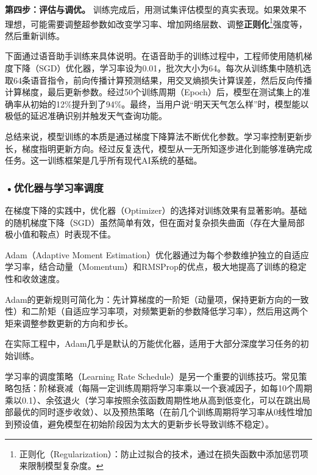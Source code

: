 
\textbf{第四步：评估与调优。} 训练完成后，用测试集评估模型的真实表现。如果效果不理想，可能需要调整超参数如改变学习率、增加网络层数、调整\textbf{正则化}\footnote{正则化（Regularization）：防止过拟合的技术，通过在损失函数中添加惩罚项来限制模型复杂度。}强度等，然后重新训练。

下面通过语音助手训练来具体说明。在语音助手的训练过程中，工程师使用随机梯度下降（SGD）优化器，学习率设为0.01，批次大小为64。每次从训练集中随机选取64条语音指令，前向传播计算预测结果，用交叉熵损失计算误差，然后反向传播计算梯度，最后更新参数。经过50个训练周期（Epoch）后，模型在测试集上的准确率从初始的12\%提升到了94\%。最终，当用户说“明天天气怎么样”时，模型能以极低的延迟准确识别并触发天气查询功能。

总结来说，模型训练的本质是通过梯度下降算法不断优化参数。学习率控制更新步长，梯度指明更新方向。经过反复迭代，模型从一无所知逐步进化到能够准确完成任务。这一训练框架是几乎所有现代AI系统的基础。





\subsubsection*{\textbf{•优化器与学习率调度}}

在梯度下降的实践中，优化器（Optimizer）的选择对训练效果有显著影响。基础的随机梯度下降（SGD）虽然简单有效，但在面对复杂损失曲面（存在大量局部极小值和鞍点）时表现不佳。

Adam（Adaptive Moment Estimation）优化器通过为每个参数维护独立的自适应学习率，结合动量（Momentum）和RMSProp的优点，极大地提高了训练的稳定性和收敛速度。

Adam的更新规则可简化为：先计算梯度的一阶矩（动量项，保持更新方向的一致性）和二阶矩（自适应学习率项，对频繁更新的参数降低学习率），然后用这两个矩来调整参数更新的方向和步长。

在实际工程中，Adam几乎是默认的万能优化器，适用于大部分深度学习任务的初始训练。

学习率的调度策略（Learning Rate Schedule）是另一个重要的训练技巧。常见策略包括：阶梯衰减（每隔一定训练周期将学习率乘以一个衰减因子，如每10个周期乘以0.1）、余弦退火（学习率按照余弦函数周期性地从高到低变化，可以在跳出局部最优的同时逐步收敛）、以及预热策略（在前几个训练周期将学习率从0线性增加到预设值，避免模型在初始阶段因为太大的更新步长导致训练不稳定）。

